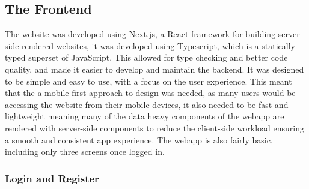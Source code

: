 \subsection{The Frontend}
The website was developed using Next.js, a React framework for building server-side rendered websites, it was developed using Typescript, which is a statically typed superset of JavaScript. This allowed for type checking and better code quality, and made it easier to develop and maintain the backend. It was designed to be simple and easy to use, with a focus on the user experience. This meant that the a mobile-first approach to design was needed, as many users would be accessing the website from their mobile devices, it also needed to be fast and lightweight meaning many of the data heavy components of the webapp are rendered with server-side components to reduce the client-side workload ensuring a smooth and consistent app experience. The webapp is also fairly basic, including only three screens once logged in.
\subsubsection{Login and Register}

